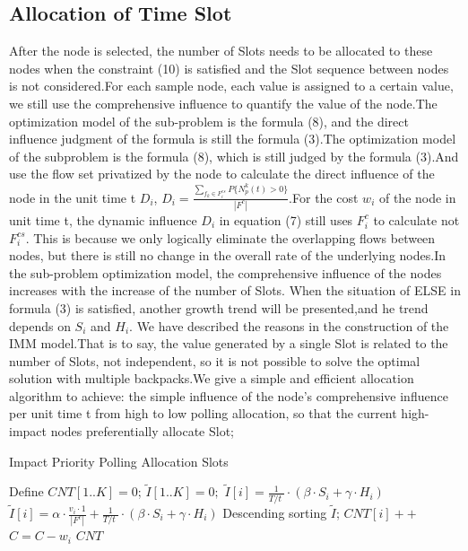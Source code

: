 \documentclass[conference,compsoc]{IEEEtran}
\begin{document}
\subsection{Allocation of Time Slot}

After the node is selected, the number of Slots needs to be allocated to these nodes when the constraint (10) is satisfied and the Slot sequence between nodes is not considered.For each sample node, each value is assigned to a certain value, we still use the comprehensive influence to quantify the value of the node.The optimization model of the sub-problem is the formula (8), and the direct influence judgment of the formula is still the formula (3).The optimization model of the subproblem is the formula (8), which is still judged by the formula (3).And use the flow set privatized by the node to calculate the direct influence of the node in the unit time t $D_i$, $D_i=\frac{\sum_{f_k \in F^{cs}_i} P\{N_p^k(t)> 0\}}{|F^c|} $.For the cost $w_i$ of the node in unit time t, the dynamic influence $D_i$ in equation (7) still uses $F_i^c$ to calculate not $F^{cs}_i$. This is because we only logically eliminate the overlapping flows between nodes, but there is still no change in the overall rate of the underlying nodes.In the sub-problem optimization model, the comprehensive influence of the nodes increases with the increase of the number of Slots. When the situation of ELSE in formula (3) is satisfied, another growth trend will be presented,and he trend depends on $S_i$ and $H_i$. We have described the reasons in the construction of the IMM model.That is to say, the value generated by a single Slot is related to the number of Slots, not independent, so it is not possible to solve the optimal solution with multiple backpacks.We give a simple and efficient allocation algorithm to achieve: the simple influence of the node's comprehensive influence per unit time t from high to low polling allocation, so that the current high-impact nodes preferentially allocate Slot;
\begin{algorithm}[h]
\caption{Impact Priority Polling Allocation Slots}
\begin{algorithmic}[1]
\STATE Define $CNT[1..K] = 0$;   $\widetilde{I}[1..K] = 0;$
\STATE  $ \widetilde{I}[i]  = \frac{1}{{T}/{t}\;}\cdot (\beta \cdot {{S}_{i}}+\gamma \cdot {{H}_{i}})$ 
\ELSE 
\STATE  $ \widetilde{I}[i]  = \alpha \cdot \frac{{{v}_{i}\cdot 1}}{\left| {{F}^{c}} \right|}+\frac{1}{{T}/{t}\;} \cdot (\beta \cdot {{S}_{i}}+\gamma \cdot {{H}_{i}})$
\ENDIF
\ENDFOR
\STATE Descending sorting $ \widetilde{I}  $;
\STATE $CNT[i]++$
\STATE $C = C - w_i $
\ENDIF
\ENDFOR
\ENDWHILE
\RETURN $CNT$
\label{code:recentEnd}
\end{algorithmic}
\end{algorithm}
\end{document}
